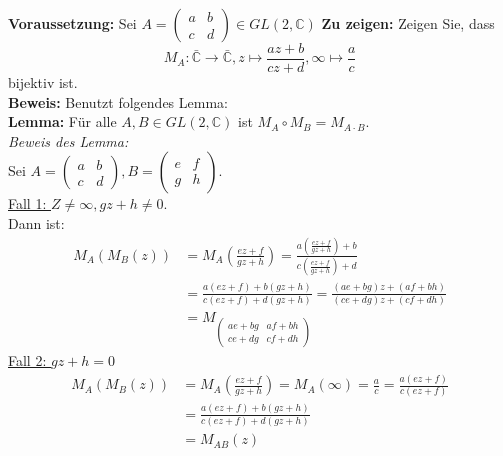 \begin{problem*}[3]
\textbf{Voraussetzung:} Sei $ A = \begin{pmatrix}
a & b \\
c & d  
\end{pmatrix} \in GL(2,\mathbb{C})$
\textbf{Zu zeigen:} Zeigen Sie, dass
\begin{equation*}
  M_A : \bar{\mathbb{C}} \to \bar{\mathbb{C}}, z \mapsto \frac{az + b}{cz + d}, \infty \mapsto \frac{a}{c}
\end{equation*}
bijektiv ist.\\
\textbf{Beweis:} Benutzt folgendes Lemma: \\
\textbf{Lemma: } Für alle $ A,B \in GL(2, \mathbb{C}) $ ist $ M_A \circ M_B = M_{ A \cdot B } $. \\
\emph{Beweis des Lemma:} \\
Sei $A = \left(\begin{smallmatrix}
a & b \\
c & d
\end{smallmatrix}\right), B = \left(\begin{smallmatrix}
e & f \\
g & h
\end{smallmatrix}\right)$. \\
\underline{Fall 1: } $Z \neq \infty, gz+h \neq 0$.\\
Dann ist:
\begin{align*}
M_A(M_B(z)) &= M_A\left(\frac{ez+f}{gz+h}\right) = \frac{a(\frac{ez+f}{gz+h}) + b}{c(\frac{ez+f}{gz+h}) + d} \\
&= \frac{a(ez+f)+b(gz+h)}{c(ez+f)+d(gz+h)} = \frac{(ae+bg)z + (af+bh)}{(ce+dg)z + (cf +dh)} \\
&= M_{ \left(\begin{smallmatrix}
ae+bg & af+bh \\
ce+dg & cf+dh 
\end{smallmatrix}\right) }
\end{align*}
\underline{Fall 2: } $gz+h = 0$ \\
\begin{align*}
M_A(M_B(z)) &= M_A\left(\frac{ez+f}{gz+h}\right) = M_A(\infty) = \frac{a}{c} = \frac{a(ez+f)}{c(ez+f)} \\
&= \frac{a(ez+f) + b(gz+h)}{c(ez+f)+d(gz+h)} \\
&= M_{ AB }(z)

\end{align*}
\end{problem*}
